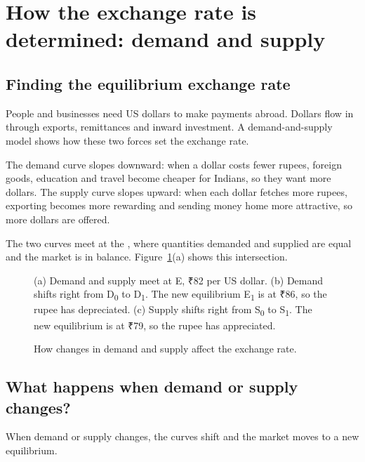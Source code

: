 \section{How the exchange rate is determined: demand and supply}\label{sec:ds}

\subsection{Finding the equilibrium exchange rate}
People and businesses need US dollars to make payments abroad. Dollars flow in through exports, remittances and inward investment. A demand-and-supply model shows how these two forces set the exchange rate.

The demand curve slopes downward: when a dollar costs fewer rupees, foreign goods, education and travel become cheaper for Indians, so they want more dollars. The supply curve slopes upward: when each dollar fetches more rupees, exporting becomes more rewarding and sending money home more attractive, so more dollars are offered.

The two curves meet at the , where quantities demanded and supplied are equal and the market is in balance. Figure~\ref{fig:ds}(a) shows this intersection.

\begin{figure}[!htb]
  \centering
  \resizebox{\linewidth}{!}{}
  \caption{How changes in demand and supply affect the exchange rate.}
  \label{fig:ds}
  {\raggedright\small\sffamily (a) Demand and supply meet at E, ₹82 per US dollar. (b) Demand shifts right from D\textsubscript{0} to D\textsubscript{1}. The new equilibrium E\textsubscript{1} is at ₹86, so the rupee has depreciated. (c) Supply shifts right from S\textsubscript{0} to S\textsubscript{1}. The new equilibrium is at ₹79, so the rupee has appreciated.\par}
\end{figure}

\subsection{What happens when demand or supply changes?}
When demand or supply changes, the curves shift and the market moves to a new equilibrium.

